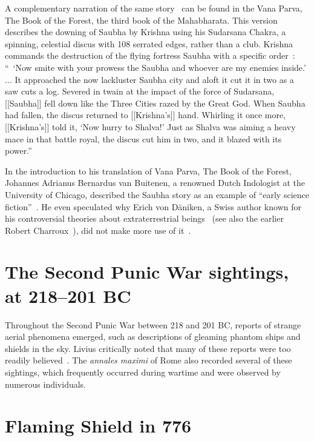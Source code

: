 A complementary narration of the same story~\cite[pp.~253-267]{vanBuitenen1975} can be found in the Vana Parva, The Book of the Forest, the third book of the Mahabharata. This version describes the downing of Saubha by Krishna using his Sudarsana Chakra, a spinning, celestial discus with 108 serrated edges, rather than a club.
Krishna commands the destruction of the flying fortress Saubha with a specific order~\cite[p.~266]{vanBuitenen1975}:
``~`Now smite with your prowess the Saubha and whoever are my enemies inside.' $\ldots$
It approached the now lackluster Saubha city and aloft it cut it in
two as a saw cuts a log. Severed in twain at the impact of the force of
Sudarsana,
[[Saubha]] fell down like the Three Cities razed by the Great God.
When Saubha had fallen, the discus returned to [[Krishna's]] hand. Whirling it
once more,[[Krishna's]] told it, `Now hurry to Shalva!' Just as Shalva was aiming
a heavy mace in that battle royal, the discus cut him in two, and it
blazed with its power.''


In the introduction to his translation of Vana Parva, The Book of the Forest, Johannes Adrianus Bernardus van Buitenen, a renowned Dutch Indologist at the University of Chicago,
described the Saubha story as an example of ``early science fiction''~\cite[p.~182]{vanBuitenen1975}.
He even speculated why Erich von D\"aniken, a Swiss author known for his controversial theories about extraterrestrial beings~\cite{vonDanikenKopp2015Apr}
(see also the earlier Robert Charroux~\cite{Charroux1971Mar}),
did not make more use of it~\cite[p.~202]{vanBuitenen1975}.


\section{The Second Punic War sightings, at 218--201 BC}
\label{2023-UFO-part-History-chapter-pre-1945-spw218-201BC}


Throughout the Second Punic War between 218 and 201 BC, reports of strange aerial phenomena emerged, such as descriptions of gleaming phantom ships and shields in the sky. Livius critically noted that many of these reports were too readily believed~\cite{Livius-21-62}. The {\it annales maximi} of Rome also recorded several of these sightings, which frequently occurred during wartime and were observed by numerous individuals.


\section{Flaming Shield in 776}
\label{2023-UFO-part-History-chapter-pre-1945-fs776}

